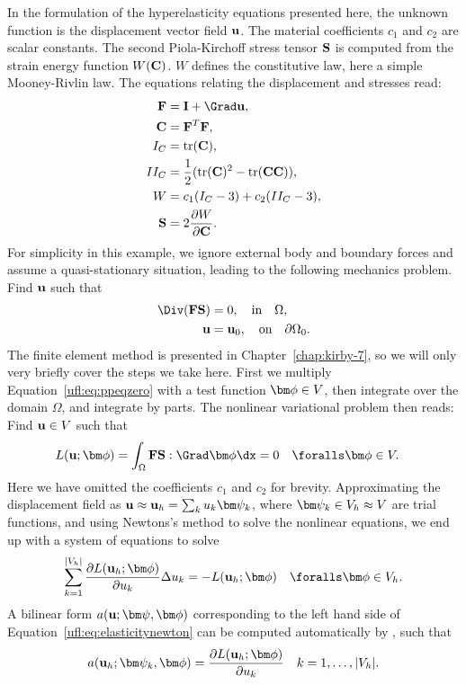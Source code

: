 In the formulation of the hyperelasticity equations presented here,
the unknown function is the displacement vector field $\mathbf{u}$.  The
material coefficients $c_1$ and $c_2$ are scalar constants.  The
second Piola-Kirchoff stress tensor $\mathbf{S}$ is computed from the strain
energy function $W(\mathbf{C})$. $W$ defines the constitutive law, here a
simple Mooney-Rivlin law. The equations relating the displacement and
stresses read:
\begin{align}
\begin{split}
\FF   &=  \II + \Grad \uu, \\
\CC   &=  \FF^T\FF, \\
I_C   &=  \mop{tr}(\CC), \\
II_C  &=  \frac 1 2 (\mop{tr}(\CC)^2 - \mop{tr}(\CC\CC)), \\
W     &=  c_1(I_C - 3) + c_2(II_C - 3), \\
\SS   &=  2\frac{\partial W}{\partial\CC}.  \label{ufl:eq:hypdef}
\end{split}
\end{align}
For simplicity in this example, we ignore external body and boundary
forces and assume a quasi-stationary situation, leading to the
following mechanics problem. Find $\mathbf{u}$ such that
\begin{align}
\Div (\FF\SS) &= 0, \quad \mbox{in} \quad\Omega, \label{ufl:eq:ppeqzero} \\
\uu &= \uu_0,       \quad \mbox{on} \quad\partial\Omega_0.
\end{align}
The finite element method is presented in Chapter~\ref{chap:kirby-7},
so we will only very briefly cover the steps we take here.
First we multiply Equation~\eqref{ufl:eq:ppeqzero} with a test function
$\bphi \in V$, then integrate over the domain $\Omega$, and integrate by parts.
The nonlinear variational problem then reads: Find $\mathbf{u} \in V$ such that
\begin{align}
L(\uu; \bphi) &= \int_\Omega \FF\SS : \Grad\bphi \dx = 0
  \quad \foralls \bphi \in V. \label{ufl:eq:hypdefL}
\end{align}
Here we have omitted the coefficients $c_1$ and $c_2$ for brevity.
Approximating the displacement field as $\uu \approx \uu_h = \sum_k
u_k \bpsi_k$, where $\bpsi_k \in V_h \approx V$ are trial functions,
and using Newtons's method to solve the nonlinear equations, we end up
with a system of equations to solve
\begin{align}
\sum_{k=1}^{|V_h|} \frac{\partial L(\uu_h; \bphi)}{\partial u_k} \Delta u_k =
  -L(\uu_h; \bphi)
  \quad \foralls \bphi \in V_h. \label{ufl:eq:elasticitynewton}
\end{align}
A bilinear form $a(\uu; \bpsi, \bphi)$ corresponding to the left hand side of Equation~\eqref{ufl:eq:elasticitynewton} can be computed automatically
by \ufl{}, such that
\begin{align}
a(\uu_h; \bpsi_k, \bphi) = \frac{\partial L(\uu_h; \bphi)}{\partial u_k}
  \quad k = 1, \ldots, |V_h|. \label{ufl:eq:hypdefa}
\end{align}

